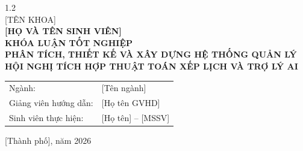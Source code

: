 \begin{titlepage}
\begin{center}
\begin{spacing}{1.2}
{\fontsize{14}{18}\\[2pt] [TÊN KHOA]}\\[1.5cm]
{\fontsize{14}{18}\selectfont\bfseries [HỌ VÀ TÊN SINH VIÊN]}\\[2.5cm]
{\fontsize{16}{20}\selectfont\bfseries KHÓA LUẬN TỐT NGHIỆP}\\[1cm]
{\fontsize{18}{26}\selectfont\bfseries PHÂN TÍCH, THIẾT KẾ VÀ XÂY DỰNG HỆ THỐNG QUẢN LÝ HỘI NGHỊ
TÍCH HỢP THUẬT TOÁN XẾP LỊCH VÀ TRỢ LÝ AI}\\[2.5cm]
\begin{tabular}{ll}
Ngành: & [Tên ngành]\\
Giảng viên hướng dẫn: & [Họ tên GVHD]\\
Sinh viên thực hiện: & [Họ tên] -- [MSSV]\\
\end{tabular}
\vfill
{[Thành phố], năm 2026}
\end{spacing}
\end{center}
\end{titlepage}
